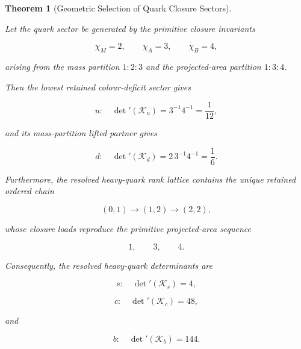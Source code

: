 \documentclass[11pt]{article}
\newtheorem{theorem}{Theorem}[section]
\theoremstyle{definition}
\theoremstyle{remark}
\begin{document}
\begin{theorem}[Geometric Selection of Quark Closure Sectors]
\label{thm:geometric_selection_quark_closure_sectors}

Let the quark sector be generated by the primitive closure
invariants

\begin{equation}
\chi_M=2,
\qquad
\chi_A=3,
\qquad
\chi_B=4,
\end{equation}

arising from the mass partition \(1:2:3\) and the projected-area
partition \(1:3:4\).

Then the lowest retained colour-deficit sector gives

\begin{equation}
u:\quad
\det{}'(\mathcal K_u)
=
3^{-1}4^{-1}
=
\frac{1}{12},
\end{equation}

and its mass-partition lifted partner gives

\begin{equation}
d:\quad
\det{}'(\mathcal K_d)
=
2\,3^{-1}4^{-1}
=
\frac{1}{6}.
\end{equation}

Furthermore, the resolved heavy-quark rank lattice contains the
unique retained ordered chain

\begin{equation}
(0,1)
\longrightarrow
(1,2)
\longrightarrow
(2,2),
\end{equation}

whose closure loads reproduce the primitive projected-area
sequence

\begin{equation}
1,
\qquad
3,
\qquad
4.
\end{equation}

Consequently, the resolved heavy-quark determinants are

\begin{equation}
s:\quad
\det{}'(\mathcal K_s)=4,
\end{equation}

\begin{equation}
c:\quad
\det{}'(\mathcal K_c)=48,
\end{equation}

and

\begin{equation}
b:\quad
\det{}'(\mathcal K_b)=144.
\end{equation}

\end{theorem}
\end{document}
